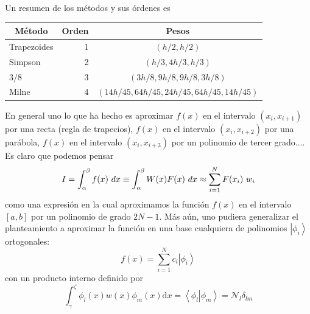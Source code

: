\documentclass[spanish,titlepage,11pt]{article}
\begin{document}
Un resumen de los m\'{e}todos y sus \'{o}rdenes es

\begin{center}%
\begin{tabular}
[c]{ccc}\hline\hline
\textbf{M\'{e}todo} & \textbf{Orden} & \textbf{Pesos}\\\hline\hline
\multicolumn{1}{l}{Trapezoides} & \multicolumn{1}{r}{1} & $\left(
h/2,h/2\right)  $\\
\multicolumn{1}{l}{Simpson} & \multicolumn{1}{r}{2} & $\left(
h/3,4h/3,h/3\right)  $\\
\multicolumn{1}{l}{$3/8$} & \multicolumn{1}{r}{3} & $\left(
3h/8,9h/8,9h/8,3h/8\right)  $\\
\multicolumn{1}{l}{Milne} & \multicolumn{1}{r}{4} & $\left(
14h/45,64h/45,24h/45,64h/45,14h/45\right)  $%
\end{tabular}
\end{center}

En general uno lo que ha hecho es aproximar $f(x)$ en el intervalo $\left(
x_{i},x_{i+1}\right)  $ por una recta (regla de trapecios), $f(x)$ en el
intervalo $\left(  x_{i},x_{i+2}\right)  $ por una par\'{a}bola, $f(x)$ en el
intervalo $\left(  x_{i},x_{i+3}\right)  $ por un polinomio de tercer
grado.... Es claro que podemos pensar
\begin{equation}
I=\int_{\alpha}^{\beta}f(x)\ {\normalsize d}x\equiv\int_{\alpha}^{\beta
}W(x)F(x)\ {\normalsize d}x\approx\sum_{i=1}^{N}F(x_{i})\ w_{i}%
\end{equation}
como una expresi\'{o}n en la cual aproximamos la funci\'{o}n $f(x)$ en el
intervalo $\left[  a,b\right]  $ por un polinomio de grado $2N-1$. M\'{a}s
a\'{u}n, uno pudiera generalizar el planteamiento a aproximar la funci\'{o}n
en una base cualquiera de polinomios $\left|  \phi_{i}\right\rangle $
ortogonales:
\begin{equation}
f(x)=\sum_{i=1}^{N}c_{i}\left|  \phi_{i}\right\rangle
\end{equation}
con un producto interno definido por
\begin{equation}
\int_{\gamma}^{\zeta}\phi_{l}(x)w(x)\phi_{m}(x)\mathrm{d}x=\left\langle
\phi_{l}\right.  \left|  \phi_{m}\right\rangle =\mathcal{N}_{l}\delta_{lm}%
\end{equation}
\end{document}
